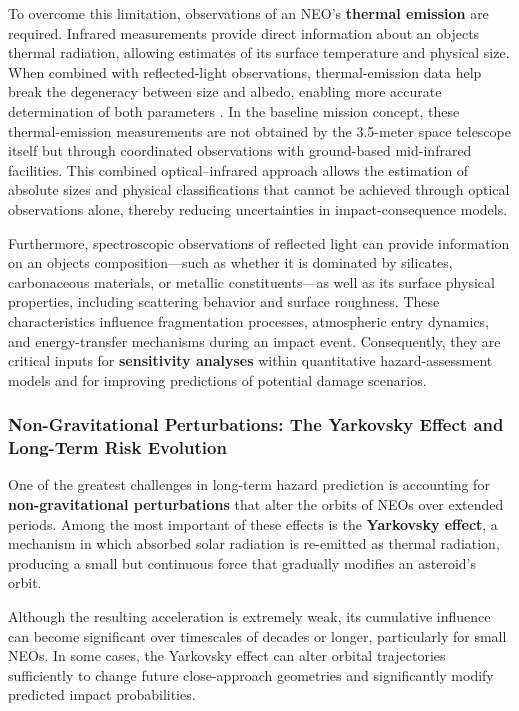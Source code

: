 To overcome this limitation, observations of an NEO's \textbf{thermal emission} are required. Infrared measurements provide direct information about an object\textquotesingle s thermal radiation, allowing estimates of its surface temperature and physical size. When combined with reflected-light observations, thermal-emission data help break the degeneracy between size and albedo, enabling more accurate determination of both parameters \cite{mainzer2011}. 
In the baseline mission concept, these thermal-emission measurements are not obtained by the 3.5-meter space telescope itself but through coordinated observations with ground-based mid-infrared facilities.
This combined optical--infrared approach allows the estimation of absolute sizes and physical classifications that cannot be achieved through optical observations alone, thereby reducing uncertainties in impact-consequence models.

Furthermore, spectroscopic observations of reflected light can provide information on an object\textquotesingle s composition---such as whether it is dominated by silicates, carbonaceous materials, or metallic constituents---as well as its surface physical properties, including scattering behavior and surface roughness. These characteristics influence fragmentation processes, atmospheric entry dynamics, and energy-transfer mechanisms during an impact event. Consequently, they are critical inputs for \textbf{sensitivity analyses} within quantitative hazard-assessment models and for improving predictions of potential damage scenarios.

\subsubsection{Non-Gravitational Perturbations: The Yarkovsky Effect and Long-Term Risk Evolution}

One of the greatest challenges in long-term hazard prediction is accounting for \textbf{non-gravitational perturbations} that alter the orbits of NEOs over extended periods. Among the most important of these effects is the \textbf{Yarkovsky effect}, a mechanism in which absorbed solar radiation is re-emitted as thermal radiation, producing a small but continuous force that gradually modifies an asteroid's orbit.

Although the resulting acceleration is extremely weak, its cumulative influence can become significant over timescales of decades or longer, particularly for small NEOs. In some cases, the Yarkovsky effect can alter orbital trajectories sufficiently to change future close-approach geometries and significantly modify predicted impact probabilities.

